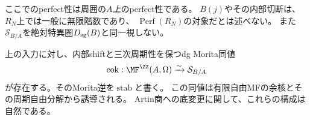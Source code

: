 ここでのperfect性は周囲の\emph{$A$上}のperfect性である。
$B(j)$やその内部切断は、$R_N$上では一般に無限階数であり、
$\operatorname{Perf}(R_N)$の対象だとは述べない。
また$\mathcal S_{B/A}$を絶対特異圏$D_{\rm sg}(B)$と同一視しない。

\begin{lemma}\label{am:lem:stabilization}
上の入力に対し、内部shiftと三次周期性を保つdg Morita同値
\begin{equation}\label{am:eq:stabilization}
 \operatorname{cok}:
 \MF^{\ZZ}(A,\Omega)\xrightarrow{\sim}\mathcal S_{B/A}
\end{equation}
が存在する。そのMorita逆を$\operatorname{stab}$と書く。
この同値は有限自由MFの余核とその周期自由分解から誘導される。
Artin商への底変更に関して、これらの構成は自然である。
\end{lemma}

